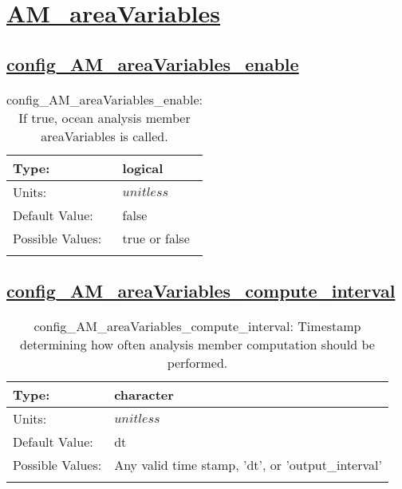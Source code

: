 \section[AM\_areaVariables]{\hyperref[sec:nm_tab_AM_areaVariables]{AM\_areaVariables}}
\label{sec:nm_sec_AM_areaVariables}
\subsection[config\_AM\_areaVariables\_enable]{\hyperref[sec:nm_tab_AM_areaVariables]{config\_AM\_areaVariables\_enable}}
\label{subsec:nm_sec_config_AM_areaVariables_enable}
\begin{center}
\begin{longtable}{| p{2.0in} || p{4.0in} |}
    \hline
    Type: & logical \\
    \hline
    Units: & $unitless$ \\
    \hline
    Default Value: & false \\
    \hline
    Possible Values: & true or false \\
    \hline
    \caption{config\_AM\_areaVariables\_enable: If true, ocean analysis member areaVariables is called.}
\end{longtable}
\end{center}
\subsection[config\_AM\_areaVariables\_compute\_interval]{\hyperref[sec:nm_tab_AM_areaVariables]{config\_AM\_areaVariables\_compute\_interval}}
\label{subsec:nm_sec_config_AM_areaVariables_compute_interval}
\begin{center}
\begin{longtable}{| p{2.0in} || p{4.0in} |}
    \hline
    Type: & character \\
    \hline
    Units: & $unitless$ \\
    \hline
    Default Value: & dt \\
    \hline
    Possible Values: & Any valid time stamp, 'dt', or 'output\_interval' \\
    \hline
    \caption{config\_AM\_areaVariables\_compute\_interval: Timestamp determining how often analysis member computation should be performed.}
\end{longtable}
\end{center}
